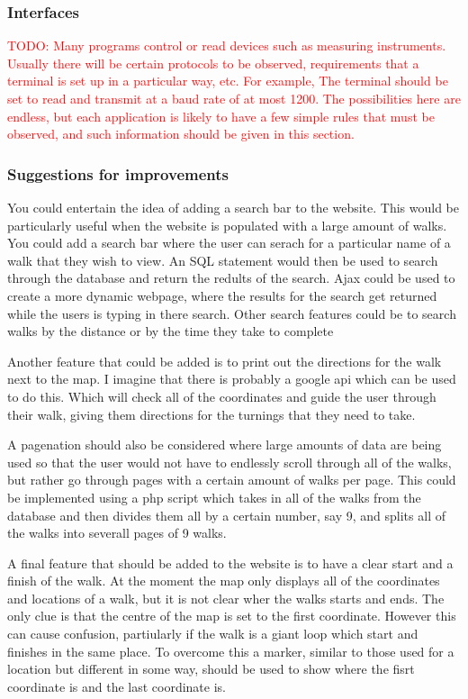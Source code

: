 \documentclass{project}
\begin{document}
\subsubsection{Interfaces}
\textcolor{red}{TODO: Many programs control or read devices such as measuring instruments. Usually there will be certain protocols to be observed, requirements that a terminal is set up in a particular way, etc. For example, The terminal should be set to read and transmit at a baud rate of at most 1200. The possibilities here are endless, but each application is likely to have a few simple rules that must be observed, and such information should be given in this section.}

\subsubsection{Suggestions for improvements}
You could entertain the idea of adding a search bar to the website. This would be particularly useful when the website is populated with a large amount of  walks. You could add a search bar where the user can serach for a particular name of a walk that they wish to view. An SQL statement would then be used to search through the database and return the redults of the search. Ajax could be used to create a more dynamic webpage, where the results for the search get returned while the users is typing in there search. Other search features could be to search walks by the distance or by the time they take to complete

  Another feature that could be added is to print out the directions for the walk next to the map. I imagine that there is probably a google api which can be used to do this. Which will check all of the  coordinates and guide the user through their walk, giving them directions for the turnings that they need to take.

  A pagenation should also be considered where large amounts of data are being used so that the user would not have to endlessly scroll through all of the walks, but rather go through pages with a certain amount of walks per page. This could be implemented using a php script which takes in all of the walks from the database and then divides them all by a certain number, say 9, and splits all of the walks into severall pages of 9 walks.

  A final feature that should be added to the website is to have a clear start and a finish of the walk. At the moment the map only displays all of the coordinates and locations of a walk, but it is not clear wher the walks starts and ends. The only clue is that the centre of the map is set to the first coordinate. However this can cause confusion, partiularly if the walk is a giant loop which start and finishes in the same place. To overcome this a marker, similar to those used for a location but different in some way, should be used to show where the fisrt coordinate is and the last coordinate is.
  
\end{document}
